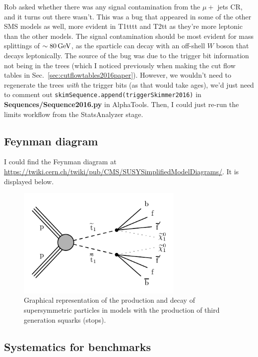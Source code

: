 
Rob asked whether there was any signal contamination from the $\mu +$ jets CR, and it turns out there wasn't. This was a bug that appeared in some of the other SMS models as well, more evident in T1tttt and T2tt as they're more leptonic than the other models. The signal contamination should be most evident for mass splittings of $\sim 80\,\text{G\text{e\kern-0.15ex V}}$, as the sparticle can decay with an off-shell $W$ boson that decays leptonically. The source of the bug was due to the trigger bit information not being in the trees (which I noticed previously when making the cut flow tables in Sec.~\ref{sec:cutflowtables2016paper}). However, we wouldn't need to regenerate the trees \emph{with} the trigger bits (as that would take ages), we'd just need to comment out \texttt{skimSequence.append(triggerSkimmer2016)} in \textbf{Sequences/Sequence2016.py} in AlphaTools. Then, I could just re-run the limits workflow from the StatsAnalyzer stage.


\subsection{Feynman diagram}

I could find the Feynman diagram at \url{https://twiki.cern.ch/twiki/pub/CMS/SUSYSimplifiedModelDiagrams/}. It is displayed below.

\begin{figure}[H]
\centering
\includegraphics[width=80mm]{./sec31/T2tt-4bd_Feynman_diagram.pdf}
\caption{Graphical representation of the production and decay of supersymmetric particles in models with the production of third generation squarks (stops).}
\end{figure}


\subsection{Systematics for benchmarks}

